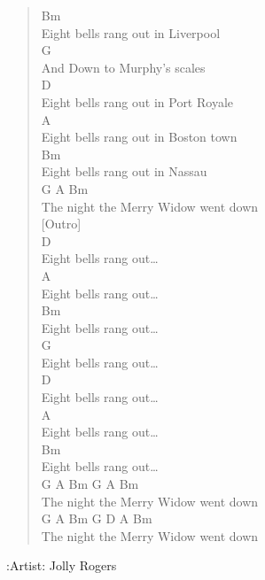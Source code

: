 \documentclass[11pt]{article}
\begin{document}
\begin{verse}
\hspace*{7em}Bm\\
Eight bells rang out in Liverpool\\
\hspace*{5em}G\\
And Down to Murphy's scales\\
\hspace*{7em}D\\
Eight bells rang out in Port Royale\\
\hspace*{7em}A\\
Eight bells rang out in Boston town\\
\hspace*{7em}Bm\\
Eight bells rang out in Nassau\\
\hspace*{5em}G               A          Bm\\
The night the Merry Widow went down\\
\vspace*{1em}
\vspace*{1em}
[Outro]\\
\vspace*{1em}
\hspace*{7em}D\\
Eight bells rang out\ldots{}\\
\hspace*{7em}A\\
Eight bells rang out\ldots{}\\
\hspace*{7em}Bm\\
Eight bells rang out\ldots{}\\
\hspace*{7em}G\\
Eight bells rang out\ldots{}\\
\hspace*{7em}D\\
Eight bells rang out\ldots{}\\
\hspace*{7em}A\\
Eight bells rang out\ldots{}\\
\hspace*{7em}Bm\\
Eight bells rang out\ldots{}\\
\hspace*{5em}G                A         Bm            G      A      Bm\\
The night the Merry Widow went down\\
\hspace*{5em}G                A         Bm     G      D      A      Bm\\
The night the Merry Widow went down\\
\end{verse}
\clearpage
:Artist:   Jolly Rogers
\end{document}
